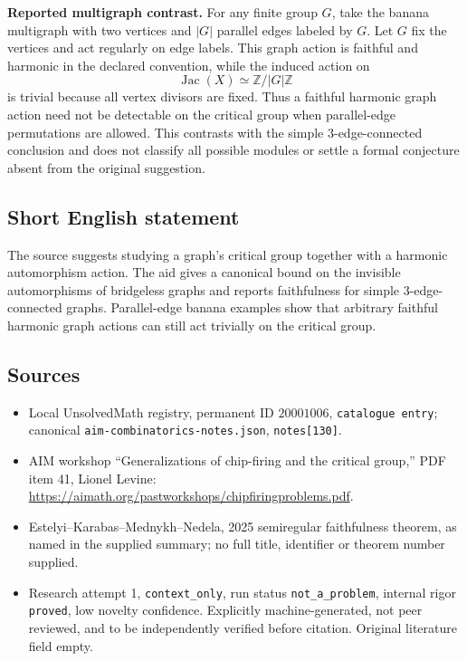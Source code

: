 \documentclass[11pt]{article}
\newcommand{\Z}{\mathbb{Z}}
\begin{document}
\textbf{Reported multigraph contrast.} For any finite group $G$, take the banana multigraph with two vertices and $|G|$ parallel edges labeled by $G$. Let $G$ fix the vertices and act regularly on edge labels. This graph action is faithful and harmonic in the declared convention, while the induced action on
\[
 \operatorname{Jac}(X)\simeq\Z/|G|\Z
\]
is trivial because all vertex divisors are fixed. Thus a faithful harmonic graph action need not be detectable on the critical group when parallel-edge permutations are allowed. This contrasts with the simple $3$-edge-connected conclusion and does not classify all possible modules or settle a formal conjecture absent from the original suggestion.
\subsection{Short English statement}
The source suggests studying a graph's critical group together with a harmonic automorphism action. The aid gives a canonical bound on the invisible automorphisms of bridgeless graphs and reports faithfulness for simple $3$-edge-connected graphs. Parallel-edge banana examples show that arbitrary faithful harmonic graph actions can still act trivially on the critical group.
\subsection{Sources}
\begin{itemize}
\item Local UnsolvedMath registry, permanent ID $20001006$, \texttt{catalogue entry}; canonical \texttt{aim-combinatorics-notes.json}, \texttt{notes[130]}.
\item AIM workshop ``Generalizations of chip-firing and the critical group,'' PDF item 41, Lionel Levine: \url{https://aimath.org/pastworkshops/chipfiringproblems.pdf}.
\item Estelyi--Karabas--Mednykh--Nedela, 2025 semiregular faithfulness theorem, as named in the supplied summary; no full title, identifier or theorem number supplied.
\item Research attempt 1, \texttt{context\_only}, run status \texttt{not\_a\_problem}, internal rigor \texttt{proved}, low novelty confidence. Explicitly machine-generated, not peer reviewed, and to be independently verified before citation. Original literature field empty.
\end{itemize}
\end{document}
